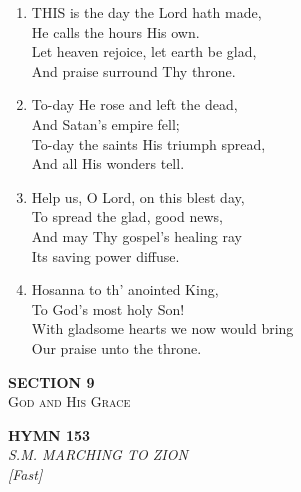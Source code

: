 \documentclass[11pt,a4paper]{article}
\begin{document}
\begin{enumerate}
    \item THIS is the day the Lord hath made, \\
        He calls the hours His own. \\
        Let heaven rejoice, let earth be glad, \\
        And praise surround Thy throne.

    \item To-day He rose and left the dead, \\
        And Satan's empire fell; \\
        To-day the saints His triumph spread, \\
        And all His wonders tell.

    \item Help us, O Lord, on this blest day, \\
        To spread the glad, good news, \\
        And may Thy gospel's healing ray \\
        Its saving power diffuse.

    \item Hosanna to th' anointed King, \\
        To God's most holy Son! \\
        With gladsome hearts we now would bring \\
        Our praise unto the throne.

\end{enumerate}

\newpage
\thispagestyle{empty}
\vspace*{3.5cm}
\begin{center}
    {\LARGE \textbf{SECTION 9}}\\[0.8em]
    {\Large \textsc{God and His Grace}}
\end{center}
\vspace{3.5cm}

\newpage
\begin{center}
    {\Large \textbf{HYMN 153}}
    \\
    \textit{S.M. MARCHING TO ZION}
    \\
    \textit{\small [Fast]}
\end{center}
\vspace{1em}
\end{document}
